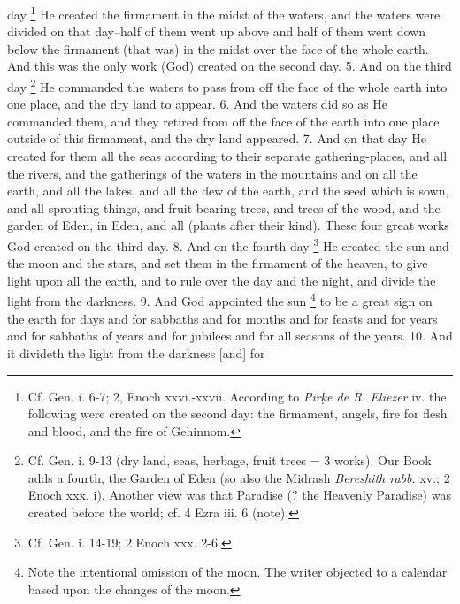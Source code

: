 day \footnote{Cf. Gen. i. 6-7; 2, Enoch xxvi.-xxvii. According to \emph{Pir\d{k}e de R. Eliezer} iv. the following were created on the second day: the firmament, angels, fire for flesh and blood, and the fire of Gehinnom.} He created the firmament in the midst of the waters, and the waters were divided on that day--half of them went up above and half of them went down below the firmament (that was) in the midst over the face of the whole earth. And this was the only work (God) created on the second day. 5. And on the third day \footnote{Cf. Gen. i. 9-13 (dry land, seas, herbage, fruit trees = 3 works). Our Book adds a fourth, the Garden of Eden (so also the Midrash \emph{Bereshith rabb.} xv.; 2 Enoch xxx. i). Another view was that Paradise (? the Heavenly Paradise) was created before the world; cf. 4 Ezra iii. 6 (note).} He commanded the waters to pass from off the face of the whole earth into one place, and the dry land to appear. 6. And the waters did so as He commanded them, and they retired from off the face of the earth into one place outside of this firmament, and the dry land appeared. 7. And on that day He created for them all the seas according to their separate gathering-places, and all the rivers, and the gatherings of the waters in the mountains and on all the earth, and all the lakes, and all the dew of the earth, and the seed which is sown, and all sprouting things, and fruit-bearing trees, and trees of the wood, and the garden of Eden, in Eden, and all (plants after their kind). These four great works God created on the third day. 8. And on the fourth day \footnote{Cf. Gen. i. 14-19; 2 Enoch xxx. 2-6.} He created the sun and the moon and the stars, and set them in the firmament of the heaven, to give light upon all the earth, and to rule over the day and the night, and divide the light from the darkness. 9. And God appointed the sun \footnote{Note the intentional omission of the moon. The writer objected to a calendar based upon the changes of the moon.} to be a great sign on the earth for days and for sabbaths and for months and for feasts and for years and for sabbaths of years and for jubilees and for all seasons of the years. 10. And it divideth the light from the darkness [and] for


